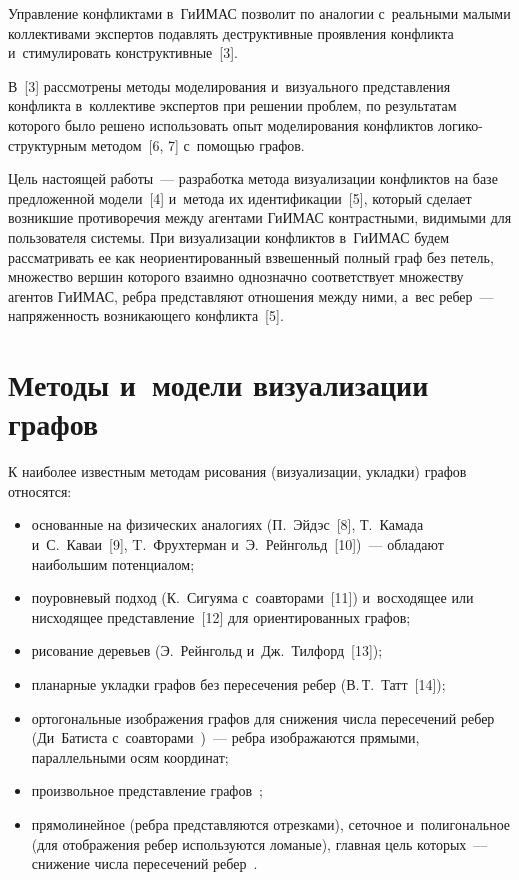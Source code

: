 \begin{multicols}{2}
Управление конфликтами в~\mbox{ГиИМАС} 
позволит по аналогии с~реальными малыми коллективами экспертов подавлять 
деструктивные проявления конфликта и~стимулировать конструктивные~[3].
   
  В~[3] рассмотрены методы моделирования и~визуального представления 
конфликта в~коллективе экспертов при решении проблем, по результатам 
которого было решено использовать опыт моделирования конфликтов  
ло\-ги\-ко-струк\-тур\-ным методом~[6, 7] с~помощью графов. 

Цель настоящей 
работы~--- разработка метода визуализации конфликтов на базе предложенной 
модели~[4] и~метода их идентификации~[5], который сделает возникшие 
противоречия между агентами \mbox{ГиИМАС} контрастными, видимыми 
для пользователя системы. При визуализации конфликтов в~\mbox{ГиИМАС} 
будем рассматривать ее как неориентированный взвешенный полный граф без 
петель, множество вершин которого взаимно однозначно соответствует 
множеству агентов \mbox{ГиИМАС}, реб\-ра представляют отношения между 
ними, а~вес ре\-бер~--- напряженность возникающего конфликта~[5]. 
{

}

\vspace*{-6pt}
  
\section{Методы и~модели визуализации графов}

\vspace*{-2pt}

  К наиболее известным методам рисования (визуализации, укладки) графов 
относятся:
  \begin{itemize}
\item основанные на физических аналогиях (П.~Эйдэс~[8], Т.~Камада 
и~С.~Каваи~[9], T.~Фрухтерман и~Э.~Рейнгольд~[10])~--- обладают 
наибольшим потенциалом;\\[-14pt] 
\item поуровневый подход (К.~Сигуяма с~соавторами~[11]) и~восходящее или нисходящее 
представление~[12] для ориентированных графов;\\[-14pt] 
\item рисование деревьев (Э.~Рейнгольд и~Дж.~Тилфорд~[13]);\\[-14pt]
\item планарные укладки графов без пересечения ребер (В.\,Т.~Татт~[14]);\\[-14pt] 
\item ортогональные изображения графов для снижения числа пересечений ребер  
(Ди~Батиста с~соавторами~\cite{15-rum})~--- ребра изображаются прямыми, 
параллельными осям координат;\\[-14pt]
\item произвольное представление графов~\cite{12-rum};\\[-14pt] 
\item прямолинейное (ребра представляются отрезками), сеточное 
и~полигональное (для отображения ребер используются ломаные), главная 
цель которых~--- снижение числа пересечений ребер~\cite{12-rum}.
\end{itemize}


\end{multicols}
